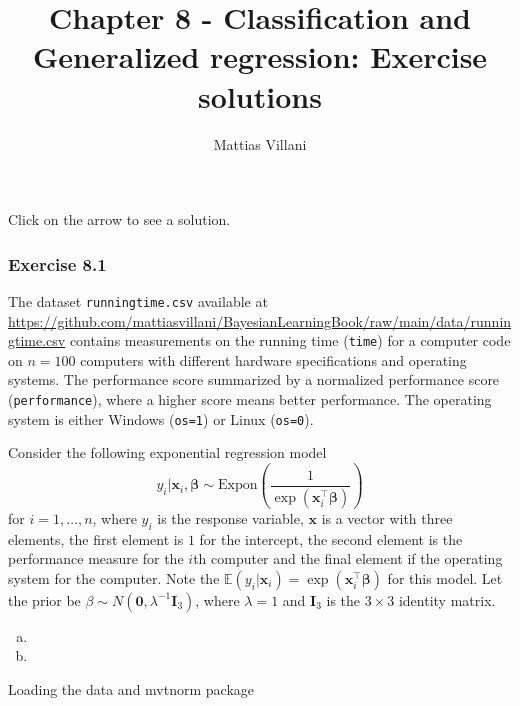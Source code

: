 \documentclass[
  letterpaper,
  DIV=11,
  numbers=noendperiod]{scrartcl}
\title{Chapter 8 - Classification and Generalized regression: Exercise
solutions}
\author{Mattias Villani}
\date{}
\begin{document}
\maketitle


Click on the arrow to see a solution.

\subsubsection{Exercise 8.1}\label{exercise-8.1}

The dataset \texttt{runningtime.csv} available at
\url{https://github.com/mattiasvillani/BayesianLearningBook/raw/main/data/runningtime.csv}
contains measurements on the running time (\texttt{time}) for a computer
code on \(n=100\) computers with different hardware specifications and
operating systems. The performance score summarized by a normalized
performance score (\texttt{performance}), where a higher score means
better performance. The operating system is either Windows
(\texttt{os=1}) or Linux (\texttt{os=0}).

Consider the following exponential regression model \begin{equation*}
   y_i \vert \mathbf{x}_i,\boldsymbol{\beta} \sim \mathrm{Expon}\left(\frac{1}{\exp\left(\mathbf{x}_i^\top \boldsymbol{\beta}\right)}\right)
  \end{equation*} for \(i=1,\ldots,n\), where \(y_i\) is the response
variable, \(\mathbf{x}\) is a vector with three elements, the first
element is \(1\) for the intercept, the second element is the
performance measure for the \(i\)th computer and the final element if
the operating system for the computer. Note the
\(\mathbb{E}(y_i \vert \mathbf{x}_i) = \exp\left(\mathbf{x}_i^\top \boldsymbol{\beta}\right)\)
for this model. Let the prior be
\(\beta\sim N(\boldsymbol{0},\lambda^{-1}\boldsymbol{I}_3)\), where
\(\lambda=1\) and \(\boldsymbol{I}_3\) is the \(3 \times 3\) identity
matrix.

\begin{enumerate}[(a)]
    \item   
    \item   
\end{enumerate}

Loading the data and mvtnorm package
\end{document}
